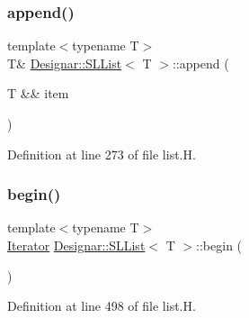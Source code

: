 \mbox{\label{class_designar_1_1_s_l_list_a2eba31f3a7629a3d96bc87f720f79918}} 
\subsubsection{\texorpdfstring{append()}{append()}\hspace{0.1cm}{\footnotesize\ttfamily [2/2]}}
{\footnotesize\ttfamily template$<$typename T$>$ \\
T\& \hyperlink{class_designar_1_1_s_l_list}{Designar\+::\+S\+L\+List}$<$ T $>$\+::append (\begin{DoxyParamCaption}\item[{T \&\&}]{item }\end{DoxyParamCaption})\hspace{0.3cm}{\ttfamily [inline]}}



Definition at line 273 of file list.\+H.

\mbox{\label{class_designar_1_1_s_l_list_aaff598b2f723981c65c5b17830537994}} 
\subsubsection{\texorpdfstring{begin()}{begin()}\hspace{0.1cm}{\footnotesize\ttfamily [1/2]}}
{\footnotesize\ttfamily template$<$typename T$>$ \\
\hyperlink{class_designar_1_1_s_l_list_1_1_iterator}{Iterator} \hyperlink{class_designar_1_1_s_l_list}{Designar\+::\+S\+L\+List}$<$ T $>$\+::begin (\begin{DoxyParamCaption}{ }\end{DoxyParamCaption})\hspace{0.3cm}{\ttfamily [inline]}}



Definition at line 498 of file list.\+H.

\mbox{\label{class_designar_1_1_s_l_list_ada42ce0576fda045f39e09d7a6846586}} 
